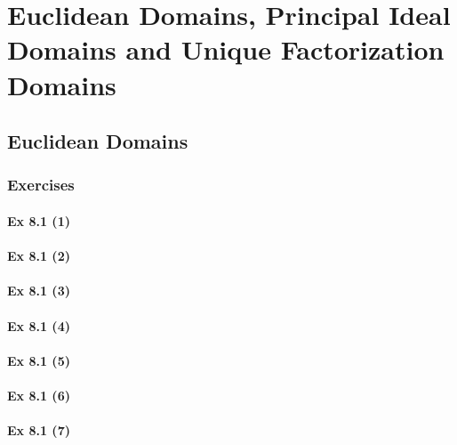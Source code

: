 \setcounter{chapter}{0}
\renewcommand{\thechapter}{8}
\chapter{Euclidean Domains, Principal Ideal Domains and Unique Factorization Domains}\label{ch:8}
\setcounter{equation}{0}	        %

\section{Euclidean Domains}\label{sec:8.1}	
\subsection*{Exercises}\label{sec:8.1_Exercises}

\subsubsection{Ex 8.1 (1)}\label{sec:Ex_8.1.1}

\subsubsection{Ex 8.1 (2)}\label{sec:Ex_8.1.2}

\subsubsection{Ex 8.1 (3)}\label{sec:Ex_8.1.3}

\subsubsection{Ex 8.1 (4)}\label{sec:Ex_8.1.4}

\subsubsection{Ex 8.1 (5)}\label{sec:Ex_8.1.5}

\subsubsection{Ex 8.1 (6)}\label{sec:Ex_8.1.6}

\subsubsection{Ex 8.1 (7)}\label{sec:Ex_8.1.7}

